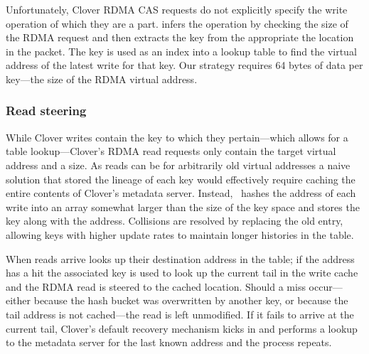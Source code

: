 Unfortunately, Clover RDMA CAS requests do not explicitly specify the
write operation of which they are a part.  {\sword} infers the
operation by checking the size of the RDMA request and then extracts
the key from the appropriate the location in the packet.  The key is
used as an index into a lookup table to find the virtual address of
the latest write for that key.  Our strategy requires 64 bytes of
data per key---the size of the RDMA virtual address.


\subsubsection{Read steering}

While Clover 
writes contain the key
to which they pertain---which allows for a table lookup---Clover's
RDMA read requests only contain the target virtual address and a size.
As reads can be for arbitrarily old virtual addresses a naive solution
that stored the lineage of each key would effectively require caching
the entire contents of Clover's metadata server.  Instead,
\sword\ hashes the address of each write into an array somewhat larger
than the size of the key space and stores the key along with the
address.  Collisions are resolved by replacing the old
entry, allowing keys with higher update rates to
maintain longer histories in the table.

When reads arrive {\sword} looks up their destination address in the
table; if the address has a hit the associated key is used to look up
the current tail in the write cache and the RDMA read is steered to
the cached location.  Should a miss occur---either because the hash
bucket was overwritten by another key, or because the tail address is
not cached---the read is left unmodified.  If it fails to arrive at
the current tail, Clover's default recovery mechanism kicks in and
performs a lookup to the metadata server for the last known address
and the process repeats.


